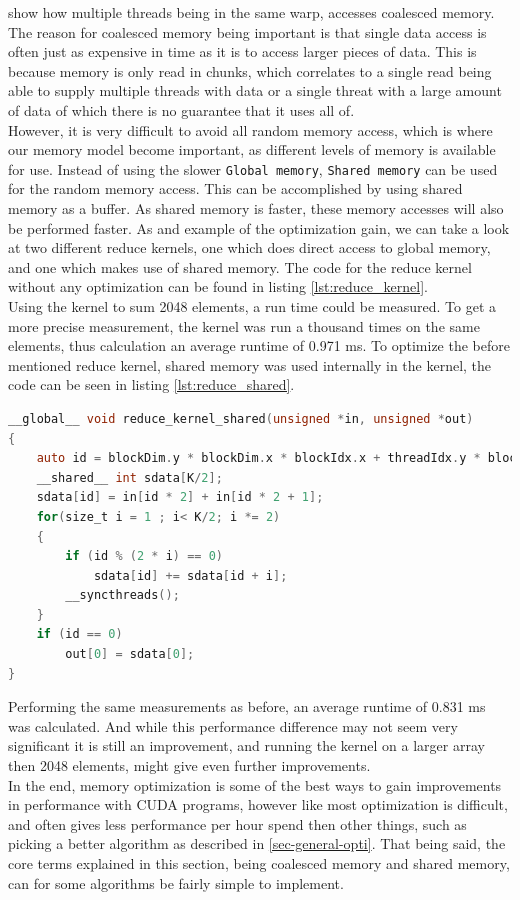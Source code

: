  show how multiple threads being in the same warp, accesses coalesced memory. The reason for coalesced memory being important is that single data access is often just as expensive in time as it is to access larger pieces of data. This is because memory is only read in chunks, which correlates to a single read being able to supply multiple threads with data or a single threat with a large amount of data of which there is no guarantee that it uses all of.\\

However, it is very difficult to avoid all random memory access, which is where our memory model become important, as different levels of memory is available for use. Instead of using the slower \texttt{Global memory}, \texttt{Shared memory} can be used for the random memory access. This can be accomplished by using shared memory as a buffer. As shared memory is faster, these memory accesses will also be performed faster. As and example of the optimization gain, we can take a look at two different reduce kernels, one which does direct access to global memory, and one which makes use of shared memory. The code for the reduce kernel without any optimization can be found in listing \ref{lst:reduce_kernel}.\\

Using the kernel to sum 2048 elements, a run time could be measured. To get a more precise measurement, the kernel was run a thousand times on the same elements, thus calculation an average runtime of 0.971 ms. To optimize the before mentioned reduce kernel, shared memory was used internally in the kernel, the code can be seen in listing \ref{lst:reduce_shared}.

\begin{lstlisting}[language=C,caption={TBD},label=lst:reduce_shared]
__global__ void reduce_kernel_shared(unsigned *in, unsigned *out) 
{
	auto id = blockDim.y * blockDim.x * blockIdx.x + threadIdx.y * blockDim.x + threadIdx.x;
	__shared__ int sdata[K/2];
	sdata[id] = in[id * 2] + in[id * 2 + 1];
	for(size_t i = 1 ; i< K/2; i *= 2) 
	{
		if (id % (2 * i) == 0)
			sdata[id] += sdata[id + i];
		__syncthreads();
	}
	if (id == 0) 
		out[0] = sdata[0];
}
\end{lstlisting}

Performing the same measurements as before, an average runtime of 0.831 ms was calculated. And while this performance difference may not seem very significant it is still an improvement, and running the kernel on a larger array then 2048 elements, might give even further improvements.\\

In the end, memory optimization is some of the best ways to gain improvements in performance with CUDA programs, however like most optimization is difficult, and often gives less performance per hour spend then other things, such as picking a better algorithm as described in \cref{sec-general-opti}. That being said, the core terms explained in this section, being coalesced memory and shared memory, can for some algorithms be fairly simple to implement. 